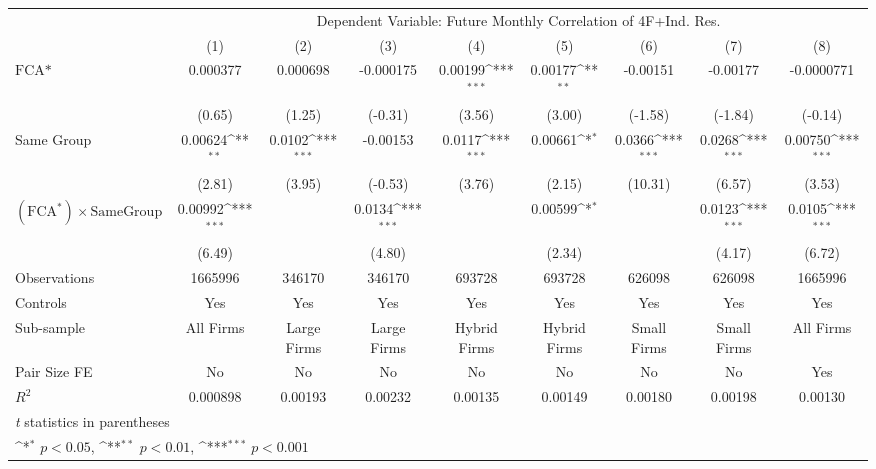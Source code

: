 {
\def\sym#1{\ifmmode^{#1}\else\(^{#1}\)\fi}
\begin{tabular}{l*{8}{c}}
\hline\hline
                &\multicolumn{8}{c}{Dependent Variable: Future Monthly Correlation of 4F+Ind. Res.}                                                                     \\\cmidrule(lr){2-9}
                &\multicolumn{1}{c}{(1)}         &\multicolumn{1}{c}{(2)}         &\multicolumn{1}{c}{(3)}         &\multicolumn{1}{c}{(4)}         &\multicolumn{1}{c}{(5)}         &\multicolumn{1}{c}{(6)}         &\multicolumn{1}{c}{(7)}         &\multicolumn{1}{c}{(8)}         \\
\hline
$ \text{FCA*} $ & 0.000377         & 0.000698         &-0.000175         &  0.00199\sym{***}&  0.00177\sym{**} & -0.00151         & -0.00177         &-0.0000771         \\
                &   (0.65)         &   (1.25)         &  (-0.31)         &   (3.56)         &   (3.00)         &  (-1.58)         &  (-1.84)         &  (-0.14)         \\
[1em]
Same Group      &  0.00624\sym{**} &   0.0102\sym{***}& -0.00153         &   0.0117\sym{***}&  0.00661\sym{*}  &   0.0366\sym{***}&   0.0268\sym{***}&  0.00750\sym{***}\\
                &   (2.81)         &   (3.95)         &  (-0.53)         &   (3.76)         &   (2.15)         &  (10.31)         &   (6.57)         &   (3.53)         \\
[1em]
 $ (\text{FCA}^*) \times {\text{SameGroup} }  $ &  0.00992\sym{***}&                  &   0.0134\sym{***}&                  &  0.00599\sym{*}  &                  &   0.0123\sym{***}&   0.0105\sym{***}\\
                &   (6.49)         &                  &   (4.80)         &                  &   (2.34)         &                  &   (4.17)         &   (6.72)         \\
\hline
Observations    &  1665996         &   346170         &   346170         &   693728         &   693728         &   626098         &   626098         &  1665996         \\
Controls        &      Yes         &      Yes         &      Yes         &      Yes         &      Yes         &      Yes         &      Yes         &      Yes         \\
Sub-sample      &All Firms         &Large Firms         &Large Firms         &Hybrid Firms         &Hybrid Firms         &Small Firms         &Small Firms         &All Firms         \\
Pair Size FE    &       No         &       No         &       No         &       No         &       No         &       No         &       No         &      Yes         \\
$ R^2 $         & 0.000898         &  0.00193         &  0.00232         &  0.00135         &  0.00149         &  0.00180         &  0.00198         &  0.00130         \\
\hline\hline
\multicolumn{9}{l}{\footnotesize \textit{t} statistics in parentheses}\\
\multicolumn{9}{l}{\footnotesize \sym{*} \(p<0.05\), \sym{**} \(p<0.01\), \sym{***} \(p<0.001\)}\\
\end{tabular}
}

